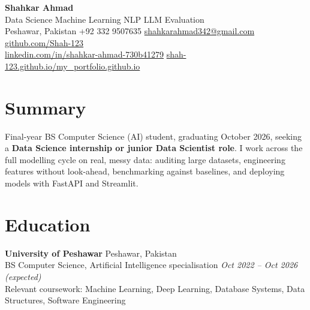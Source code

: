 \documentclass[10pt,a4paper]{article}
\begin{document}
\begin{center}
  {\fontsize{22}{26}\selectfont\bfseries\color{accent} Shahkar Ahmad}\\[3pt]
  Data Science \textbullet{} Machine Learning \textbullet{} NLP \textbullet{} LLM Evaluation\\[3pt]
  \small
  Peshawar, Pakistan \enspace\textbar\enspace +92 332 9507635 \enspace\textbar\enspace
  \href{mailto:shahkarahmad342@gmail.com}{shahkarahmad342@gmail.com} \enspace\textbar\enspace
  \href{https://github.com/Shah-123}{github.com/Shah-123}\\[1pt]
  \href{https://www.linkedin.com/in/shahkar-ahmad-730b41279/}{linkedin.com/in/shahkar-ahmad-730b41279}
  \enspace\textbar\enspace
  \href{https://shah-123.github.io/my_portfolio.github.io/}{shah-123.github.io/my\_portfolio.github.io}
\end{center}
\vspace{-6pt}

\section{Summary}
Final-year BS Computer Science (AI) student, graduating October 2026, seeking a
\textbf{Data Science internship or junior Data Scientist role}. I work across the full
modelling cycle on real, messy data: auditing large datasets, engineering features without
look-ahead, benchmarking against baselines, and deploying models with FastAPI and Streamlit.

\section{Education}
\textbf{University of Peshawar} \hfill Peshawar, Pakistan\\
BS Computer Science, Artificial Intelligence specialisation \hfill
\textit{Oct 2022 -- Oct 2026 (expected)}\\
{\small Relevant coursework: Machine Learning, Deep Learning, Database Systems,
Data Structures, Software Engineering}
\end{document}
